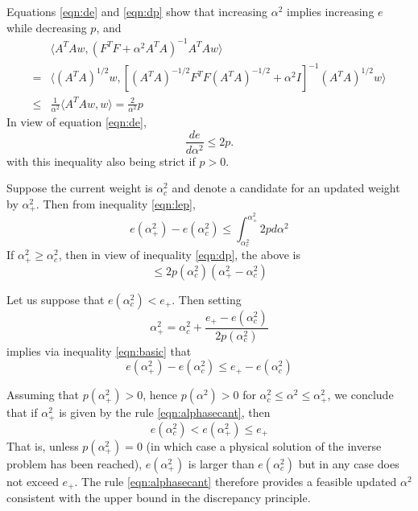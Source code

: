 Equations \ref{eqn:de} and \ref{eqn:dp} show that increasing $\alpha^2$ implies increasing $e$ while decreasing $p$, and
\begin{align}
&\langle A^TA w,(F^TF + \alpha^2 A^TA)^{-1} A^TA w \rangle \nonumber \\ 
=& \langle (A^TA)^{1/2}w,[(A^TA)^{-1/2}F^TF(A^TA)^{-1/2} + \alpha^2 I]^{-1}(A^TA)^{1/2}w \rangle \nonumber \\ 
\le& \frac{1}{\alpha^2} \langle A^TA w, w\rangle = \frac{2}{\alpha^2}p
\end{align}
In view of equation \ref{eqn:de},
\begin{equation}
\label{eqn:lep}
\frac{de}{d\alpha^2}  \le 2p.
\end{equation}
with this inequality also being strict if $p > 0$.

Suppose the current weight is $\alpha^2_c$ and denote a candidate for an updated weight by $\alpha^2_+$. Then from inequality \ref{eqn:lep},
\begin{equation}
e(\alpha^2_+)-e(\alpha^2_c) \le \int_{\alpha^2_c}^{\alpha^2_+} 2p d\alpha^2
\end{equation}
If $\alpha^2_+ \ge \alpha^2_c$, then in view of inequality \ref{eqn:dp}, the above is
\begin{equation}
\label{eqn:basic}
\le 2 p(\alpha^2_c) (\alpha^2_+-\alpha^2_c)  
\end{equation}

Let us suppose that $e(\alpha^2_c) < e_{+}$. Then setting 
\begin{equation}
\label{eqn:alphasecant}
\alpha^2_+ = \alpha^2_c + \frac{e_{+}-e(\alpha^2_c)}{2p(\alpha^2_c)} 
\end{equation}
implies via inequality \ref{eqn:basic} that 
\begin{equation}
e(\alpha^2_+)-e(\alpha^2_c) \le e_{+}-e(\alpha^2_c)
\end{equation}

Assuming that $p(\alpha^2_+) > 0$, hence $p(\alpha^2)>0$ for $\alpha^2_c \le \alpha^2 \le \alpha^2_+$,  we conclude that if $\alpha^2_+$ is given by the rule \ref{eqn:alphasecant},
then
\begin{equation}
\label{eqn:assert}
e(\alpha^2_c) < e(\alpha^2_+) \le e_{+}
\end{equation}
That is, unless $p(\alpha^2_+) = 0$ (in which case a physical solution of the inverse problem has been reached),  $e(\alpha^2_+)$ is larger than $e(\alpha^2_c)$ but in any case does not exceed $e_+$. The rule \ref{eqn:alphasecant} therefore provides a feasible updated $\alpha^2$ consistent with the upper bound in the discrepancy principle.


